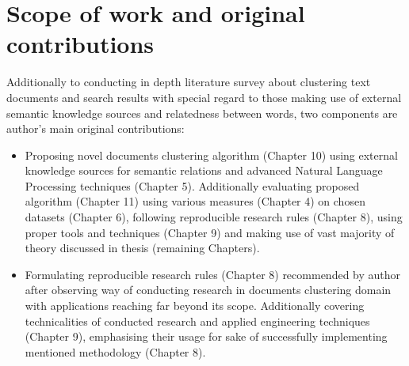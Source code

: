 \documentclass[a4paper, 12pt, oneside]{Thesis} %
\begin{document}
\section{Scope of work and original contributions} Additionally to conducting in depth literature survey about clustering text documents and search results with special regard to those making use of external semantic knowledge sources and relatedness between words, two components are author's main original contributions:

\begin{itemize}
 \item Proposing novel documents clustering algorithm (Chapter 10) using external knowledge sources for semantic relations and advanced Natural Language Processing techniques (Chapter 5). Additionally evaluating proposed algorithm (Chapter 11) using various measures (Chapter 4) on chosen datasets (Chapter 6), following reproducible research rules (Chapter 8), using proper tools and techniques (Chapter 9) and making use of vast majority of theory discussed in thesis (remaining Chapters).
 
 \item Formulating reproducible research rules (Chapter 8) recommended by author after observing way of conducting research in documents clustering domain with applications reaching far beyond its scope. Additionally covering technicalities of conducted research and applied engineering techniques (Chapter 9), emphasising their usage for sake of successfully implementing mentioned methodology (Chapter 8).
\end{itemize}

\clearpage
\end{document}
